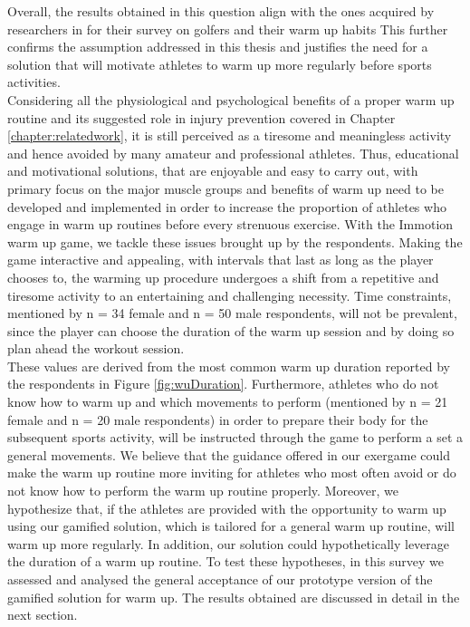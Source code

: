 Overall, the results obtained in this question align with the ones acquired by researchers in \cite{fradkin2010effects} for their survey on golfers and their warm up habits  This further confirms the assumption addressed in this thesis and justifies the need for a solution that will motivate athletes to warm up more regularly before sports activities. \\Considering all the physiological and psychological benefits of a proper warm up routine and its suggested role in injury prevention covered in Chapter \ref{chapter:relatedwork}, it is still perceived as a tiresome and meaningless activity and hence avoided by many amateur and professional athletes. Thus, educational and motivational solutions, that are enjoyable and easy to carry out, with primary focus on the major muscle groups and benefits of warm up need to be developed and implemented in order to increase the proportion of athletes who engage in warm up routines before every strenuous exercise. With the Immotion warm up game, we tackle these issues brought up by the respondents. Making the game interactive and appealing, with intervals that last as long as the player chooses to, the warming up procedure undergoes a shift from a repetitive and tiresome activity to an entertaining and challenging necessity. Time constraints, mentioned by n = 34 female and n = 50 male respondents, will not be prevalent, since the player can choose the duration of the warm up session and by doing so plan ahead the workout session.\\ These values are derived from the most common warm up duration reported by the respondents in Figure \ref{fig:wuDuration}. Furthermore, athletes who do not know how to warm up and which movements to perform (mentioned by n = 21 female and n = 20 male respondents) in order to prepare their body for the subsequent sports activity, will be instructed through the game to perform a set a general movements. We believe that the guidance offered in our exergame could make the warm up routine more inviting for athletes who most often avoid or do not know how to perform the warm up routine properly. Moreover, we hypothesize that, if the athletes are provided with the opportunity to warm up using our gamified solution, which is tailored for a general warm up routine, will warm up more regularly. In addition, our solution could hypothetically leverage the duration of a warm up routine. To test these hypotheses, in this survey we assessed and analysed the general acceptance of our prototype version of the gamified solution for warm up. The results obtained are discussed in detail in the next section. 

